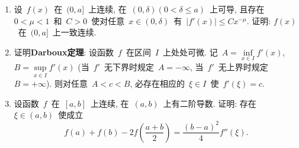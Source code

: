 \documentclass[UTF8,a4paper,20pt]{article}
\begin{document}
\begin{enumerate}
\item 设~$f(x)$~在~$(0,a]$~上连续, 在~$(0,\delta) (0<\delta\leqslant a)$~上可导, 且存在~$0<\mu<1$~和~$C>0$~使对任意~$x\in(0,\delta)$~有~$|f'(x)|\leqslant Cx^{-\mu}$. 证明: $f(x)$~在~$(0,a]$~上一致连续. 

\item 证明{\bf Darboux定理}: 设函数~$f$~在区间~$I$~上处处可微. 记~$A=\inf\limits_{x\in I}f'(x)$, $B=\sup\limits_{x\in I}f'(x)$ (当~$f'$~无下界时规定~$A=-\infty$, 当~$f'$~无上界时规定~$B=+\infty$). 则对任意~$A<c<B$, 必存在相应的~$\xi\in I$~使~$f'(\xi)=c$.

\item 设函数~$f$~在~$[a,b]$~上连续, 在~$(a,b)$~上有二阶导数. 证明: 存在~$\xi\in(a,b)$~使成立
\[f(a)+f(b)-2f\left(\dfrac{a+b}{2}\right)=\dfrac{(b-a)^2}{4}f''(\xi).\]
\end{enumerate}

\clearpage
\end{document}
